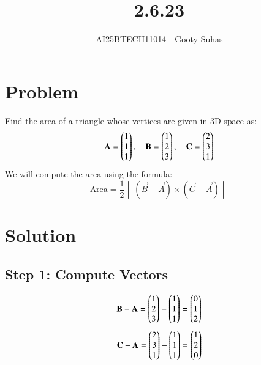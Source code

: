 \documentclass[journal]{IEEEtran}
\begin{document}

\vspace{3cm}

\title{2.6.23}
\author{AI25BTECH11014 - Gooty Suhas}
{\let\newpage\relax\maketitle}

\renewcommand{\thefigure}{\theenumi}
\renewcommand{\thetable}{\theenumi}
\setlength{\intextsep}{10pt}
\renewcommand{\thetable}{\theenumi}

\section*{\large\textbf{Problem}}
\vspace{0.5cm}

Find the area of a triangle whose vertices are given in 3D space as:
\[
\mathbf{A} = \begin{pmatrix}1 \\ 1 \\ 1\end{pmatrix}, \quad
\mathbf{B} = \begin{pmatrix}1 \\ 2 \\ 3\end{pmatrix}, \quad
\mathbf{C} = \begin{pmatrix}2 \\ 3 \\ 1\end{pmatrix}
\]
We will compute the area using the formula:
\[
\text{Area} = \frac{1}{2} \left\| (\vec{B} - \vec{A}) \times (\vec{C} - \vec{A}) \right\|
\]

\section*{\large\textbf{Solution}}
\vspace{0.5cm}

\subsection*{Step 1: Compute Vectors}
\[
\mathbf{B} - \mathbf{A} = \begin{pmatrix}1 \\ 2 \\ 3\end{pmatrix} - \begin{pmatrix}1 \\ 1 \\ 1\end{pmatrix} = \begin{pmatrix}0 \\ 1 \\ 2\end{pmatrix}
\]
\[
\mathbf{C} - \mathbf{A} = \begin{pmatrix}2 \\ 3 \\ 1\end{pmatrix} - \begin{pmatrix}1 \\ 1 \\ 1\end{pmatrix} = \begin{pmatrix}1 \\ 2 \\ 0\end{pmatrix}
\]
\end{document}
